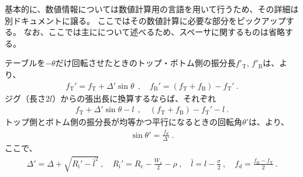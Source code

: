 




基本的に、数値情報については数値計算用の言語を用いて行うため、その詳細は別ドキュメントに譲る。
ここではその数値計算に必要な部分をピックアップする。
なお、ここでは主に\DMname について述べるため、スペーサに関するものは省略する。


テーブルを$-\theta$だけ回転させたときのトップ・ボトム側の振分長$f'_\mathrm T$, $f'_\mathrm B$は、より、
\begin{align*}
  f_\mathrm T' = f_\mathrm T+\varDelta'\!\sin\theta~~, \quad
  f_\mathrm B' = (f_\mathrm T+f_\mathrm B)-f_\mathrm T'\ .
\end{align*}
ジグ（長さ$2l$）からの張出長に換算するならば、それぞれ
\begin{align*}
  f_\mathrm T+\varDelta'\!\sin\theta-l~~, \quad
  (f_\mathrm T+f_\mathrm B)-f_\mathrm T'-l\ .
\end{align*}
トップ側とボトム側の振分長が均等かつ平行になるときの回転角$\theta'$は、より、
\begin{align*}
  \sin\theta' = \frac{f_d}{\varDelta'}\ .
\end{align*}
ここで、
\begin{align*}
  \varDelta' = \varDelta+\sqrt{R_\mathrm i'-\bar l^2}\ , \quad
  R_\mathrm i' = R_\mathrm c-\frac{W_x}2-\rho\ ,\quad
  \bar l = l-\frac\sigma2\ ,\quad
  f_d = \frac{f_\mathrm B-f_\mathrm T}2\ .
\end{align*}



